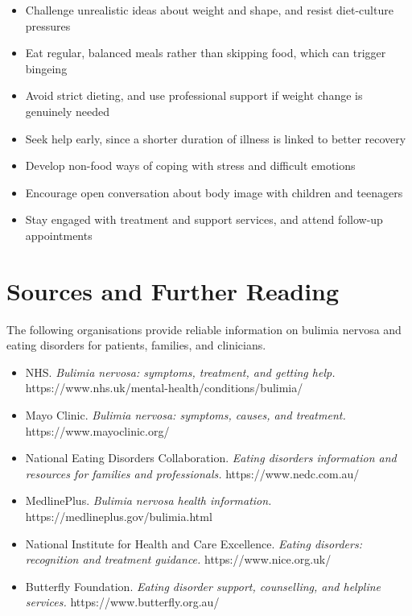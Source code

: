 \begin{itemize}
    \item Challenge unrealistic ideas about weight and shape, and resist diet-culture pressures
    \item Eat regular, balanced meals rather than skipping food, which can trigger bingeing
    \item Avoid strict dieting, and use professional support if weight change is genuinely needed
    \item Seek help early, since a shorter duration of illness is linked to better recovery
    \item Develop non-food ways of coping with stress and difficult emotions
    \item Encourage open conversation about body image with children and teenagers
    \item Stay engaged with treatment and support services, and attend follow-up appointments
\end{itemize}

\section*{Sources and Further Reading}
The following organisations provide reliable information on bulimia nervosa and eating disorders for patients, families, and clinicians.

\begin{itemize}
    \item NHS. \textit{Bulimia nervosa: symptoms, treatment, and getting help.} https://www.nhs.uk/mental-health/conditions/bulimia/
    \item Mayo Clinic. \textit{Bulimia nervosa: symptoms, causes, and treatment.} https://www.mayoclinic.org/
    \item National Eating Disorders Collaboration. \textit{Eating disorders information and resources for families and professionals.} https://www.nedc.com.au/
    \item MedlinePlus. \textit{Bulimia nervosa health information.} https://medlineplus.gov/bulimia.html
    \item National Institute for Health and Care Excellence. \textit{Eating disorders: recognition and treatment guidance.} https://www.nice.org.uk/
    \item Butterfly Foundation. \textit{Eating disorder support, counselling, and helpline services.} https://www.butterfly.org.au/
\end{itemize}
